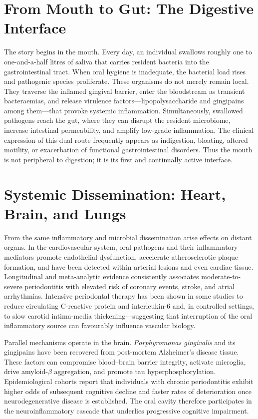 \documentclass[11pt,a4paper]{article}
\begin{document}
\section{From Mouth to Gut: The Digestive Interface}
The story begins in the mouth. Every day, an individual swallows roughly one to one-and-a-half litres of saliva that carries resident bacteria into the gastrointestinal tract. When oral hygiene is inadequate, the bacterial load rises and pathogenic species proliferate. These organisms do not merely remain local. They traverse the inflamed gingival barrier, enter the bloodstream as transient bacteraemias, and release virulence factors---lipopolysaccharide and gingipains among them---that provoke systemic inflammation. Simultaneously, swallowed pathogens reach the gut, where they can disrupt the resident microbiome, increase intestinal permeability, and amplify low-grade inflammation. The clinical expression of this dual route frequently appears as indigestion, bloating, altered motility, or exacerbation of functional gastrointestinal disorders. Thus the mouth is not peripheral to digestion; it is its first and continually active interface.

\section{Systemic Dissemination: Heart, Brain, and Lungs}
From the same inflammatory and microbial dissemination arise effects on distant organs. In the cardiovascular system, oral pathogens and their inflammatory mediators promote endothelial dysfunction, accelerate atherosclerotic plaque formation, and have been detected within arterial lesions and even cardiac tissue. Longitudinal and meta-analytic evidence consistently associates moderate-to-severe periodontitis with elevated risk of coronary events, stroke, and atrial arrhythmias. Intensive periodontal therapy has been shown in some studies to reduce circulating C-reactive protein and interleukin-6 and, in controlled settings, to slow carotid intima-media thickening---suggesting that interruption of the oral inflammatory source can favourably influence vascular biology.

Parallel mechanisms operate in the brain. \textit{Porphyromonas gingivalis} and its gingipains have been recovered from post-mortem Alzheimer’s disease tissue. These factors can compromise blood--brain barrier integrity, activate microglia, drive amyloid-$\beta$ aggregation, and promote tau hyperphosphorylation. Epidemiological cohorts report that individuals with chronic periodontitis exhibit higher odds of subsequent cognitive decline and faster rates of deterioration once neurodegenerative disease is established. The oral cavity therefore participates in the neuroinflammatory cascade that underlies progressive cognitive impairment.
\end{document}
